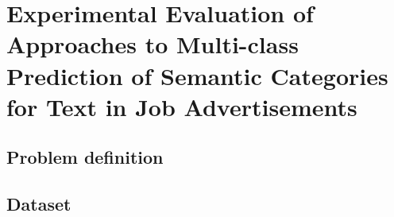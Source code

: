 
\clearpage

\section{Experimental Evaluation of Approaches to  Multi-class Prediction of Semantic Categories for Text in Job Advertisements}
\label{sec:Experimental Evaluation of Multi-class Prediction of Semantic Categories for Text in Job Advertisements}

\subsection{Problem definition}

\subsection{Dataset}

